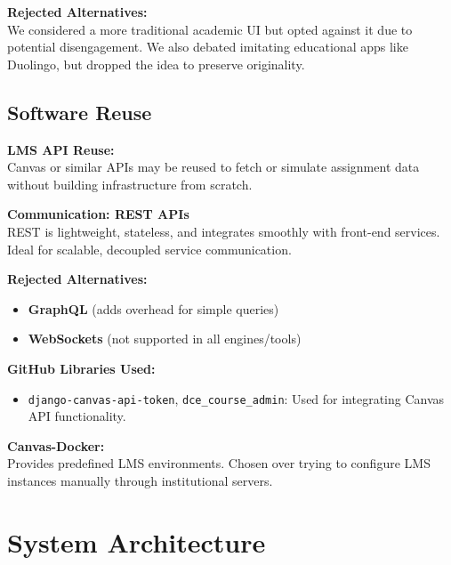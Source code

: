 \documentclass[12pt]{article}
\begin{document}
\vspace{1em}

\textbf{Rejected Alternatives:}\\
We considered a more traditional academic UI but opted against it due to potential disengagement. We also debated imitating educational apps like Duolingo, but dropped the idea to preserve originality.

\subsection{Software Reuse}

\textbf{LMS API Reuse:}\\
Canvas or similar APIs may be reused to fetch or simulate assignment data without building infrastructure from scratch.

\vspace{1em}

\textbf{Communication: REST APIs}\\
REST is lightweight, stateless, and integrates smoothly with front-end services. Ideal for scalable, decoupled service communication.

\vspace{1em}

\textbf{Rejected Alternatives:}
\begin{itemize}
    \item \textbf{GraphQL} (adds overhead for simple queries)
    \item \textbf{WebSockets} (not supported in all engines/tools)
\end{itemize}

\vspace{1em}

\textbf{GitHub Libraries Used:}
\begin{itemize}
    \item \texttt{django-canvas-api-token}, \texttt{dce_course_admin}: Used for integrating Canvas API functionality.
\end{itemize}

\vspace{1em}

\textbf{Canvas-Docker:}\\
Provides predefined LMS environments. Chosen over trying to configure LMS instances manually through institutional servers.

\section{System Architecture }
\end{document}
